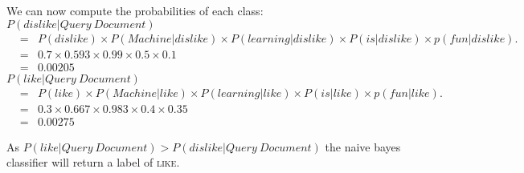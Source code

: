 \documentclass[solution]{ditpaper}
\begin{document}
\begin{answer}
We can now compute the probabilities of each class:\\

$P(dislike|Query~Document)$
			\begin{eqnarray*}
&=& P(dislike) \times P(Machine|dislike) \times P(learning|dislike) \times P(is|dislike) \times p(fun|dislike).\\
&=& 0.7 \times 0.593 \times 0.99 \times 0.5 \times 0.1\\
&=& 0.00205
			\end{eqnarray*}
$P(like|Query~Document)$
			\begin{eqnarray*}
&=& P(like) \times P(Machine|like) \times P(learning|like) \times P(is|like) \times p(fun|like).\\
&=& 0.3 \times 0.667 \times 0.983 \times 0.4 \times 0.35\\
&=& 0.00275
			\end{eqnarray*}
			
As $P(like|Query~Document) > P(dislike|Query~Document)$ the naive bayes classifier will return a label of \textsc{like}.
		\end{answer}
%
\newpage
\clearpage

\end{document}
